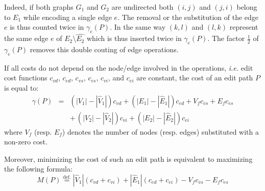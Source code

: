   Indeed, if both graphs $G_1$ and $G_2$ are undirected both $(i,j)$
  and $(j,i)$ belong to $E_1$ while encoding a single edge $e$.  The
  removal or the substitution of the edge $e$ is thus counted twice in
  $\gamma_e(P)$. In the same way $(k,l)$ and $(l,k)$ represent the
  same edge $e$ of $E_2\setminus\hat{E_2}$ which is thus inserted twice in
  $\gamma_e(P)$. The factor $\frac{1}{2}$ of $\gamma_e(P)$ removes
   this double couting of edge operations.
\begin{corollary}\label{coro:costEditPathConst}
  If all costs do not depend on the node/edge involved in the operations, \textit{i.e.} edit cost functions $c_{vd}$, $c_{ed}$, $c_{vs}$, $c_{es}$, $c_{vi}$, and $c_{ei}$ are constant, the cost of an edit path $P$ is equal to:
  \renewcommand{\arraystretch}{1.5}
  \begin{equation*}
    \begin{array}{lcl}
      \gamma(P) & = & (|V_1|-|\hat{V}_1|)c_{vd}+(|E_1|-|\hat{E}_1|)c_{ed}+V_fc_{vs}+E_fc_{es}\\
      &   & +\,(|V_2|-|\hat{V}_2|)c_{vi}+(|E_2|-|\hat{E}_2|)c_{ei}    
    \end{array}
  \end{equation*}
  where $V_f$ (resp. $E_f$) denotes the number of
  nodes (resp. edges) substituted with a non-zero cost.
  
  Moreover, minimizing the cost of such an edit path is
  equivalent to maximizing the following formula:
  \[
  M(P)\overset{\text{def.}}{=}|\hat{V}_1|(c_{vd}+c_{vi})+
  |\hat{E}_1|(c_{ed}+c_{ei})-V_fc_{vs}-E_fc_{es}
  \]
\end{corollary}
